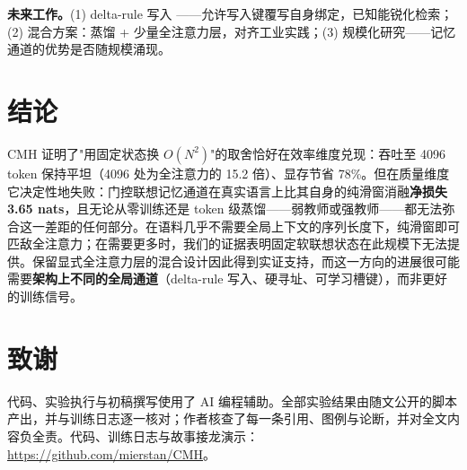 \documentclass[11pt]{ctexart}
\newcommand{\cmh}{CMH}
\begin{document}
\textbf{未来工作。}(1) delta-rule 写入 \cite{yang2023delta}——允许写入键覆写自身绑定，已知能锐化检索；(2) 混合方案：蒸馏 + 少量全注意力层，对齐工业实践；(3) 规模化研究——记忆通道的优势是否随规模涌现。

\section{结论}

\cmh{} 证明了"用固定状态换 $O(N^2)$"的取舍恰好在效率维度兑现：吞吐至 4096 token 保持平坦（4096 处为全注意力的 15.2 倍）、显存节省 78\%。但在质量维度它决定性地失败：门控联想记忆通道在真实语言上比其自身的纯滑窗消融\textbf{净损失 3.65 nats}，且无论从零训练还是 token 级蒸馏——弱教师或强教师——都无法弥合这一差距的任何部分。在语料几乎不需要全局上下文的序列长度下，纯滑窗即可匹敌全注意力；在需要更多时，我们的证据表明固定软联想状态在此规模下无法提供。保留显式全注意力层的混合设计因此得到实证支持，而这一方向的进展很可能需要\textbf{架构上不同的全局通道}（delta-rule 写入、硬寻址、可学习槽键），而非更好的训练信号。

\section*{致谢}

代码、实验执行与初稿撰写使用了 AI 编程辅助。全部实验结果由随文公开的脚本产出，并与训练日志逐一核对；作者核查了每一条引用、图例与论断，并对全文内容负全责。代码、训练日志与故事接龙演示：\url{https://github.com/mierstan/CMH}。
\end{document}
